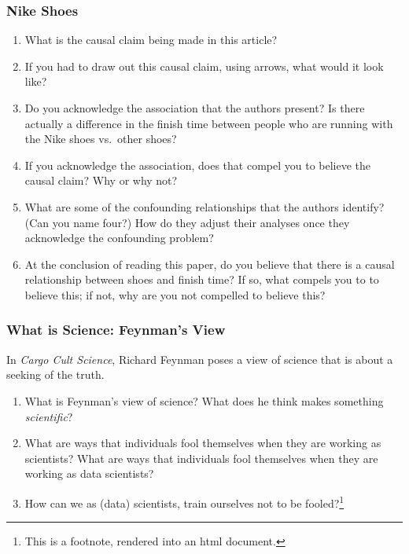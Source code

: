 \documentclass[
]{article}
\providecommand{\tightlist}{%
  \setlength{\itemsep}{0pt}\setlength{\parskip}{0pt}}
\theoremstyle{definition}
\theoremstyle{definition}
\theoremstyle{definition}
\theoremstyle{definition}
\theoremstyle{remark}
\begin{document}
\subsubsection{Nike Shoes}\label{nike-shoes}

\begin{enumerate}
\def\labelenumi{\arabic{enumi}.}
\tightlist
\item
  What is the causal claim being made in this article?
\item
  If you had to draw out this causal claim, using arrows, what would it look like?
\item
  Do you acknowledge the association that the authors present? Is there actually a difference in the finish time between people who are running with the Nike shoes vs.~other shoes?
\item
  If you acknowledge the association, does that compel you to believe the causal claim? Why or why not?
\item
  What are some of the confounding relationships that the authors identify? (Can you name four?) How do they adjust their analyses once they acknowledge the confounding problem?
\item
  At the conclusion of reading this paper, do you believe that there is a causal relationship between shoes and finish time? If so, what compels you to to believe this; if not, why are you not compelled to believe this?
\end{enumerate}

\subsubsection{What is Science: Feynman's View}\label{what-is-science-feynmans-view}

In \emph{Cargo Cult Science}, Richard Feynman poses a view of science that is about a seeking of the truth.

\begin{enumerate}
\def\labelenumi{\arabic{enumi}.}
\tightlist
\item
  What is Feynman's view of science? What does he think makes something \emph{scientific}?
\item
  What are ways that individuals fool themselves when they are working as scientists? What are ways that individuals fool themselves when they are working as data scientists?
\item
  How can we as (data) scientists, train ourselves not to be fooled?\footnote{This is a footnote, rendered into an html document.}
\end{enumerate}
\end{document}
